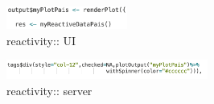 \begin{figure}[h]
\centering %
\includegraphics[width=150px]{images/reatividadeUI.png} 
\caption{reactivity:: UI}
\label{ui}
\end{figure}
\begin{figure}[h]
\centering %
\includegraphics[width=250px]{images/reatividadeSERVER.png} 
\caption{reactivity:: server}
\label{server}
\end{figure}









